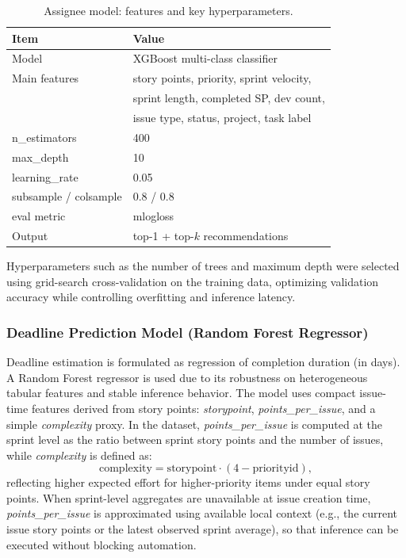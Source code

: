 \documentclass[conference]{IEEEtran}
\begin{document}
\begin{table}[t]
\centering
\caption{Assignee model: features and key hyperparameters.}
\renewcommand{\arraystretch}{1.15}
\begin{tabular}{l l}
\hline
\textbf{Item} & \textbf{Value} \\
\hline
Model & XGBoost multi-class classifier \\
Main features & story points, priority, sprint velocity, \\
& sprint length, completed SP, dev count, \\
& issue type, status, project, task label \\
n\_estimators & 400 \\
max\_depth & 10 \\
learning\_rate & 0.05 \\
subsample / colsample & 0.8 / 0.8 \\
eval metric & mlogloss \\
Output & top-1 + top-$k$ recommendations \\
\hline
\end{tabular}
\label{tab:xgb_config}
\end{table}

Hyperparameters such as the number of trees and maximum depth were selected using grid-search cross-validation on the training data, optimizing validation accuracy while controlling overfitting and inference latency.

\subsubsection{Deadline Prediction Model (Random Forest Regressor)}
Deadline estimation is formulated as regression of completion duration (in days). A Random Forest regressor is used due to its robustness on heterogeneous tabular features and stable inference behavior. The model uses compact issue-time features derived from story points: \textit{storypoint}, \textit{points\_per\_issue}, and a simple \textit{complexity} proxy. In the dataset, \textit{points\_per\_issue} is computed at the sprint level as the ratio between sprint story points and the number of issues, while \textit{complexity} is defined as:
\begin{equation}
\mathrm{complexity} = \mathrm{storypoint}\cdot(4-\mathrm{priorityid}),
\end{equation}
reflecting higher expected effort for higher-priority items under equal story points. When sprint-level aggregates are unavailable at issue creation time, \textit{points\_per\_issue} is approximated using available local context (e.g., the current issue story points or the latest observed sprint average), so that inference can be executed without blocking automation.
\end{document}
